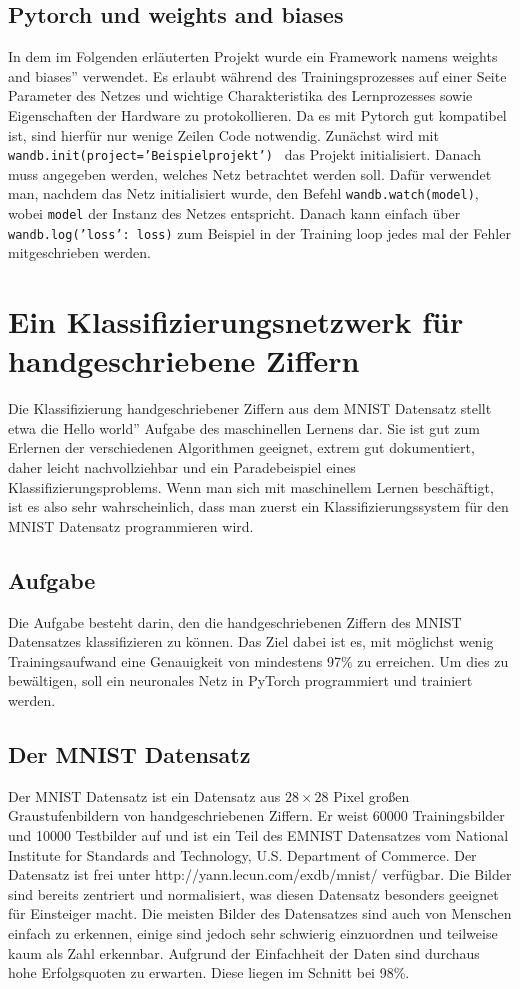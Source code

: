 \documentclass[11pt]{article}
\begin{document}
\subsection{Pytorch und weights and biases}
In dem im Folgenden erläuterten Projekt wurde ein Framework namens \glqq weights and biases'' verwendet. Es erlaubt während des Trainingsprozesses auf einer Seite Parameter des Netzes und wichtige Charakteristika des Lernprozesses sowie Eigenschaften der Hardware zu protokollieren. Da es mit Pytorch gut kompatibel ist, sind hierfür nur wenige Zeilen Code notwendig. Zunächst wird mit\\ \texttt{wandb.init(project='Beispielprojekt')
} das Projekt initialisiert. Danach muss angegeben werden, welches Netz betrachtet werden soll. Dafür verwendet man, nachdem das Netz initialisiert wurde, den Befehl \texttt{wandb.watch(model)}, wobei \texttt{model} der Instanz des Netzes entspricht. Danach kann einfach über\\ 
\texttt{wandb.log({'loss': loss})} zum Beispiel in der Training loop jedes mal der Fehler mitgeschrieben werden.
\section{Ein Klassifizierungsnetzwerk für handgeschriebene Ziffern}
Die Klassifizierung handgeschriebener Ziffern aus dem MNIST Datensatz stellt etwa die \glqq Hello world'' Aufgabe des maschinellen Lernens dar. Sie ist gut zum Erlernen der verschiedenen Algorithmen geeignet, extrem gut dokumentiert, daher leicht nachvollziehbar und ein Paradebeispiel eines Klassifizierungsproblems. Wenn man sich mit maschinellem Lernen beschäftigt, ist es also sehr wahrscheinlich, dass man zuerst ein Klassifizierungssystem für den MNIST Datensatz programmieren wird.
\subsection{Aufgabe}
Die Aufgabe besteht darin, den die handgeschriebenen Ziffern des MNIST Datensatzes klassifizieren zu können. Das Ziel dabei ist es, mit möglichst wenig Trainingsaufwand eine Genauigkeit von mindestens 97\% zu erreichen. Um dies zu bewältigen, soll ein neuronales Netz in PyTorch programmiert und trainiert werden.
\subsection{Der MNIST Datensatz}
Der MNIST Datensatz ist ein Datensatz aus $28\times28$ Pixel großen Graustufenbildern von handgeschriebenen Ziffern. Er weist 60000 Trainingsbilder und 10000 Testbilder auf und ist ein Teil des EMNIST Datensatzes vom National Institute for Standards and Technology, U.S. Department of Commerce. Der Datensatz ist frei unter http://yann.lecun.com/exdb/mnist/ verfügbar. Die Bilder sind bereits zentriert und normalisiert, was diesen Datensatz besonders geeignet für Einsteiger macht. Die meisten Bilder des Datensatzes sind auch von Menschen einfach zu erkennen, einige sind jedoch sehr schwierig einzuordnen und teilweise kaum als Zahl erkennbar. Aufgrund der Einfachheit der Daten sind durchaus hohe Erfolgsquoten zu erwarten. Diese liegen im Schnitt bei 98\%.
\end{document}
